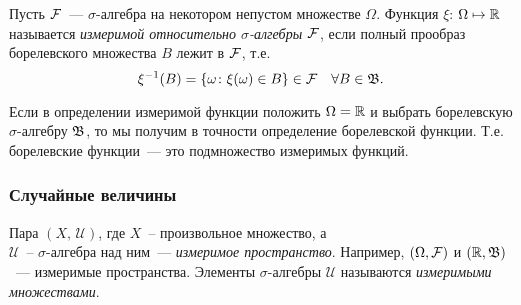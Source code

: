 \begin{defn}
    Пусть $\mathcal{F}$~--- $\sigma$-алгебра на некотором непустом множестве $\Omega$.
    Функция $\xi$: $\Omega \mapsto \mathbb{R}$ называется \textit{измеримой относительно $\sigma$-алгебры $\mathcal{F}$}, если полный прообраз борелевского множества $B$ лежит в $\mathcal{F}$, т.е. 
    \begin{equation*}
        \xi^{-1}(B) = \{\omega \colon \xi(\omega) \in B \} \in \mathcal{F} \quad \forall B \in \mathfrak{B}.
    \end{equation*}
\end{defn}

\begin{rmrk}
    Если в определении измеримой функции положить $\Omega = \mathbb{R}$ и выбрать борелевскую $\sigma$-алгебру $\mathfrak{B}$, то мы получим в точности определение борелевской функции. 
    Т.е. борелевские функции~--- это подмножество измеримых функций.
\end{rmrk}

\subsubsection{Случайные величины}
\begin{defn}
    Пара $(X,\, \mathcal{U})$, где $X$~-- произвольное множество, а \\ $\mathcal{U}$~-- $\sigma$-алгебра над ним~--- \textit{измеримое пространство}. 
    Например, $(\Omega, \mathcal{F})$ и $(\mathbb{R}, \mathfrak{B})$~--- измеримые пространства. 
    Элементы $\sigma$-алгебры $\mathcal{U}$ называются \textit{измеримыми множествами}.
\end{defn}

